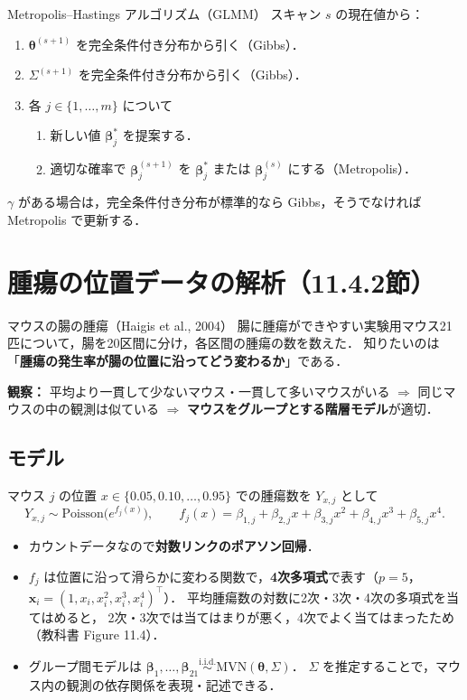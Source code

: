\documentclass[lualatex,ja=standard,a4paper,12pt]{bxjsarticle}
\newcommand{\mvn}{\mathrm{MVN}}
\begin{document}
\begin{algobox}{Metropolis--Hastings アルゴリズム（GLMM）}
スキャン $s$ の現在値から：
\begin{enumerate}
  \item $\bm{\theta}^{(s+1)}$ を完全条件付き分布から引く（Gibbs）．
  \item $\Sigma^{(s+1)}$ を完全条件付き分布から引く（Gibbs）．
  \item 各 $j \in \{1, \ldots, m\}$ について
  \begin{enumerate}
    \item 新しい値 $\bm{\beta}_j^*$ を提案する．
    \item 適切な確率で $\bm{\beta}_j^{(s+1)}$ を $\bm{\beta}_j^*$ または $\bm{\beta}_j^{(s)}$ にする（Metropolis）．
  \end{enumerate}
\end{enumerate}
$\gamma$ がある場合は，完全条件付き分布が標準的なら Gibbs，そうでなければ Metropolis で更新する．
\end{algobox}

\section{腫瘍の位置データの解析（11.4.2節）}

\begin{exbox}{マウスの腸の腫瘍（Haigis et al., 2004）}
腸に腫瘍ができやすい実験用マウス21匹について，腸を20区間に分け，各区間の腫瘍の数を数えた．
知りたいのは「\textbf{腫瘍の発生率が腸の位置に沿ってどう変わるか}」である．

\medskip
\noindent\textbf{観察：}
平均より一貫して少ないマウス・一貫して多いマウスがいる
$\Rightarrow$ 同じマウスの中の観測は似ている
$\Rightarrow$ \textbf{マウスをグループとする階層モデル}が適切．
\end{exbox}

\subsection{モデル}

マウス $j$ の位置 $x \in \{0.05, 0.10, \ldots, 0.95\}$ での腫瘍数を $Y_{x,j}$ として
\[
  Y_{x,j} \sim \mathrm{Poisson}\bigl(e^{f_j(x)}\bigr),
  \qquad
  f_j(x) = \beta_{1,j} + \beta_{2,j}x + \beta_{3,j}x^2 + \beta_{4,j}x^3 + \beta_{5,j}x^4.
\]
\begin{itemize}
  \item カウントデータなので\textbf{対数リンクのポアソン回帰}．
  \item $f_j$ は位置に沿って滑らかに変わる関数で，\textbf{4次多項式}で表す（$p = 5$，
        $\bm{x}_i = (1, x_i, x_i^2, x_i^3, x_i^4)^\top$）．
        平均腫瘍数の対数に2次・3次・4次の多項式を当てはめると，
        2次・3次では当てはまりが悪く，4次でよく当てはまったため（教科書 Figure 11.4）．
  \item グループ間モデルは $\bm{\beta}_1, \ldots, \bm{\beta}_{21} \overset{\text{i.i.d.}}{\sim} \mvn(\bm{\theta}, \Sigma)$．
        $\Sigma$ を推定することで，マウス内の観測の依存関係を表現・記述できる．
\end{itemize}
\end{document}
